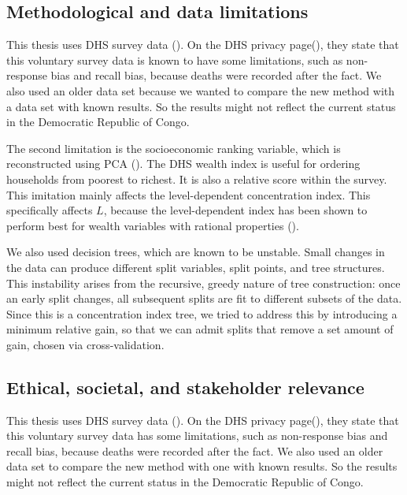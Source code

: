 \documentclass[
  11pt,
  a4paper,
]{article}
\begin{document}
\subsection{Methodological and data
limitations}\label{methodological-and-data-limitations}

This thesis uses DHS survey data
(). On
the DHS privacy page(), they state that this voluntary survey data is known to
have some limitations, such as non-response bias and recall bias,
because deaths were recorded after the fact. We also used an older data
set because we wanted to compare the new method with a data set with
known results. So the results might not reflect the current status in
the Democratic Republic of Congo.

The second limitation is the socioeconomic ranking variable, which is
reconstructed using PCA
(). The DHS wealth index is useful for ordering households from
poorest to richest. It is also a relative score within the survey. This
imitation mainly affects the level-dependent concentration index. This
specifically affects \(L\), because the level-dependent index has been
shown to perform best for wealth variables with rational properties
().

We also used decision trees, which are known to be unstable. Small
changes in the data can produce different split variables, split points,
and tree structures. This instability arises from the recursive, greedy
nature of tree construction: once an early split changes, all subsequent
splits are fit to different subsets of the data. Since this is a
concentration index tree, we tried to address this by introducing a
minimum relative gain, so that we can admit splits that remove a set
amount of gain, chosen via cross-validation.

\subsection{Ethical, societal, and stakeholder
relevance}\label{ethical-societal-and-stakeholder-relevance}

This thesis uses DHS survey data
(). On
the DHS privacy page(), they state that this voluntary survey data has some
limitations, such as non-response bias and recall bias, because deaths
were recorded after the fact. We also used an older data set to compare
the new method with one with known results. So the results might not
reflect the current status in the Democratic Republic of Congo.
\end{document}
